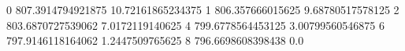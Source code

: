 0 807.3914794921875 10.72161865234375
1 806.357666015625 9.68780517578125
2 803.6870727539062 7.0172119140625
4 799.6778564453125 3.00799560546875
6 797.9146118164062 1.2447509765625
8 796.6698608398438 0.0
